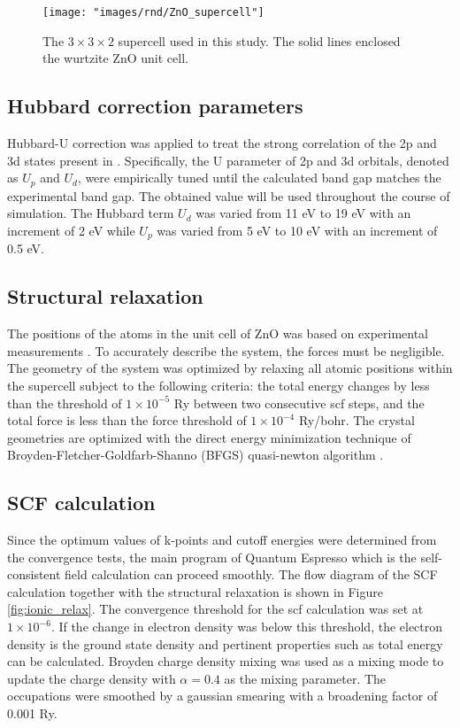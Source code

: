 \begin{figure}[tbh!]
	\centering
	\texttt{[image: "images/rnd/ZnO\_supercell"]}
	\caption[The $3 \times 3 \times 2$ supercell used in this study]{The $3 \times 3 \times 2$ supercell used in this study. The solid lines enclosed the wurtzite ZnO unit cell. }
	\label{fig:zno_supercell}
\end{figure}


\subsection{Hubbard correction parameters}
Hubbard-U correction was applied to treat the strong correlation of the 2p and 3d states present in . Specifically, the U parameter of 2p and 3d orbitals, denoted as $U_{p}$ and $U_{d}$, were empirically tuned until the calculated band gap matches the experimental band gap. The obtained value will be used throughout the course of simulation.  The Hubbard term $U_d$ was varied from 11 eV to 19 eV with an increment of 2 eV while $U_p$ was varied from 5 eV to 10 eV with an increment of 0.5 eV.

\subsection{Structural relaxation}
The positions of the atoms in the unit cell of ZnO was based on experimental measurements \citep{Sabine1969}.  To accurately describe the system, the forces must be negligible. The geometry of the system was optimized by relaxing all atomic positions within the supercell subject to the following criteria: the total energy changes by less than the threshold of $1 \times 10^{-5}$ Ry between two consecutive scf steps, and the total force is less than the force threshold of $1 \times 10^{-4}$ Ry/bohr. The crystal  geometries are optimized with the direct energy minimization technique of Broyden-Fletcher-Goldfarb-Shanno (BFGS) quasi-newton algorithm \citep{Broyden1970,Fletcher1970,Goldfarb1970,Shanno1970}.

\subsection{SCF calculation}
Since the optimum values of k-points and cutoff energies were determined from the convergence tests, the main program of Quantum Espresso which is the self-consistent field calculation can proceed smoothly. The flow diagram of the SCF calculation together with the structural relaxation is shown in Figure \ref{fig:ionic_relax}. The convergence threshold for the scf calculation was set at $1 \times 10^{-6}$. If the change in electron density was below this threshold, the electron density is the ground state density and pertinent properties such as total energy can be calculated. Broyden charge density mixing \citep{Broyden1965} was used as a mixing mode to update the charge density with  $\alpha = 0.4$ as the mixing parameter.   The occupations were smoothed by a gaussian smearing with a broadening factor of 0.001 Ry.

